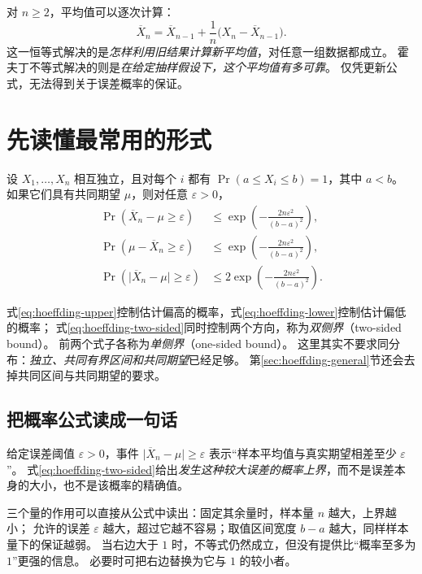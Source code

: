 \documentclass[UTF8,12pt,a4paper,fontset=fandol]{ctexart}
\begin{document}
对 $n\geq2$，平均值可以逐次计算：
\[
  \overline X_n=\overline X_{n-1}
  +\frac1n\bigl(X_n-\overline X_{n-1}\bigr).
\]
这一恒等式解决的是\emph{怎样利用旧结果计算新平均值}，对任意一组数据都成立。
霍夫丁不等式解决的则是\emph{在给定抽样假设下，这个平均值有多可靠}。
仅凭更新公式，无法得到关于误差概率的保证。

\section{先读懂最常用的形式}
\label{sec:hoeffding-common-form}

\begin{theorem}[共同有界区间下的霍夫丁不等式]
\label{thm:hoeffding-common}
设 $X_1,\ldots,X_n$ 相互独立，且对每个 $i$ 都有 $\Pr(a\leq X_i\leq b)=1$，其中 $a<b$。
如果它们具有共同期望 $\mu$，则对任意 $\varepsilon>0$，
\begin{align}
  \Pr(\overline X_n-\mu\geq\varepsilon)
  &\leq \exp\!\left(-\frac{2n\varepsilon^2}{(b-a)^2}\right),
  \label{eq:hoeffding-upper}\\
  \Pr(\mu-\overline X_n\geq\varepsilon)
  &\leq \exp\!\left(-\frac{2n\varepsilon^2}{(b-a)^2}\right),
  \label{eq:hoeffding-lower}\\
  \Pr\!\left(\lvert\overline X_n-\mu\rvert\geq\varepsilon\right)
  &\leq 2\exp\!\left(-\frac{2n\varepsilon^2}{(b-a)^2}\right).
  \label{eq:hoeffding-two-sided}
\end{align}
\end{theorem}

式\eqref{eq:hoeffding-upper}控制估计偏高的概率，式\eqref{eq:hoeffding-lower}控制估计偏低的概率；
式\eqref{eq:hoeffding-two-sided}同时控制两个方向，称为\emph{双侧界}（two-sided bound）。
前两个式子各称为\emph{单侧界}（one-sided bound）。
这里其实不要求同分布：\emph{独立、共同有界区间和共同期望}已经足够。
第\ref{sec:hoeffding-general}节还会去掉共同区间与共同期望的要求。

\subsection{把概率公式读成一句话}

给定误差阈值 $\varepsilon>0$，事件
$\lvert\overline X_n-\mu\rvert\geq\varepsilon$
表示“样本平均值与真实期望相差至少 $\varepsilon$”。
式\eqref{eq:hoeffding-two-sided}给出\emph{发生这种较大误差的概率上界}，而不是误差本身的大小，也不是该概率的精确值。

三个量的作用可以直接从公式中读出：固定其余量时，样本量 $n$ 越大，上界越小；
允许的误差 $\varepsilon$ 越大，超过它越不容易；取值区间宽度 $b-a$ 越大，同样样本量下的保证越弱。
当右边大于 $1$ 时，不等式仍然成立，但没有提供比“概率至多为 $1$”更强的信息。
必要时可把右边替换为它与 $1$ 的较小者。
\end{document}

